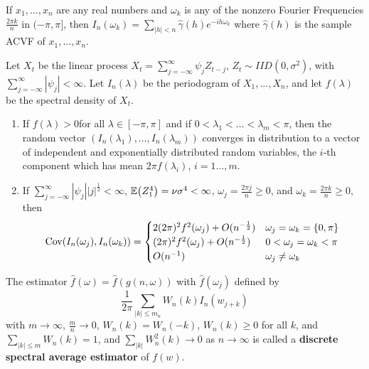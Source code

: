 \begin{thm}
  \label{sec:periodogram-2}
  If $x_{1}, \dots, x_{n}$ are any real numbers and $\omega_{k}$ is
  any of the nonzero Fourier Frequencies $\frac{2 \pi k}{n}$ in
  $(-\pi, \pi]$, then $I_{n}(\omega_{k}) = \sum_{|h| < n}^{} \hat
  \gamma(h) e^{-ih \omega_{k}}$ where $\hat \gamma(h)$ is the sample
  ACVF of $x_{1}, \dots, x_{n}$.
\end{thm}

\begin{thm}
  \label{sec:periodogram-4}
  Let $X_{t}$ be the linear process $X_{t} = \sum_{j=-\infty}^{\infty}
  \psi_{j} Z_{t-j}$, $Z_{t} \sim IID(0, \sigma^{2})$, with
  $\sum_{j=-\infty}^{\infty} |\psi_{j}| < \infty$. Let
  $I_{n}(\lambda)$ be the periodogram of $X_{1}, \dots, X_{n}$, and
  let $f(\lambda)$ be the spectral density of $X_{t}$.
  \begin{enumerate}
  \item If $f(\lambda) > 0$for all $\lambda \in [-\pi, \pi]$ and if $0
    < \lambda_{1} < \dots < \lambda_{m} < \pi$, then the random vector
    $(I_{n}(\lambda_{1}), \dots, I_{n}(\lambda_{m}))$ converges in
    distribution to a vector of independent and exponentially
    distributed random variables, the $i$-th component which has mean
    $2\pi f(\lambda_{i})$, $i = 1 \dots, m $.
  \item If $\sum_{j=-\infty}^{\infty} |\psi_{j}| |j|^{\frac{1}{2}} <
    \infty$, $\E{Z^{4}_{1}} = \nu \sigma^{4} < \infty$, $\omega_{j} =
    \frac{2 \pi j}{n} \geq 0$, and $\omega_{k} = \frac{2 \pi k}{n}
    \geq 0$, then
    \begin{align}
      \label{eq:75}
      \Cov{I_{n}(\omega_{j})}{I_{n}(\omega_{k})} =
      \begin{cases}
        2(2 \pi)^{2} f^{2}(\omega_{j}) + O(n^{-\frac{1}{2} }) &
        \omega_{j} = \omega_{k} = \{ 0, \pi \} \\
        (2 \pi)^{2} f^{2}(\omega_{j})+ O(n^{-\frac{1}{2} }) & 0 <
        \omega_{j} = \omega_{k} < \pi \\
        O(n^{-1}) & \omega_{j} \neq \omega_{k}
      \end{cases}
    \end{align}
  \end{enumerate}

\end{thm}

\begin{defn}
  \label{sec:periodogram-3}
  The estimator $\hat f(\omega) = \hat f(g(n, \omega))$ with $\hat
  f(\omega_{j})$ defined by
  \begin{equation}
    \frac{1}{2 \pi} \sum_{|k| \leq m_{n}}^{} W_{n}(k) I_{n}(w_{j+k})\label{eq:79}  
  \end{equation}
  with $m \rightarrow \infty$, $\frac{m}{n} \rightarrow 0$, $W_{n}(k)
  = W_{n}(-k)$, $W_{n}(k) \geq 0$ for all $k$, and $\sum_{|k| \leq
    m}^{} W_{n}(k) = 1$, and $\sum_{|k|}^{} W_{n}^{2}(k) \rightarrow
  0$ as $n \rightarrow \infty$ is called a \textbf{discrete spectral
    average estimator} of $f(w)$.
\end{defn}

